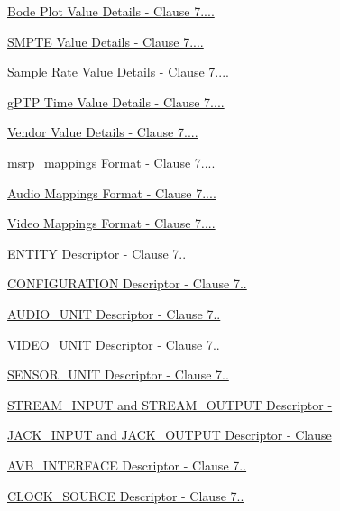 \begin{DoxyCompactItemize}
\item 
\hyperlink{group__values__bode__plot}{Bode Plot Value Details -\/ Clause 7....}
\item 
\hyperlink{group__values__smpte__time}{S\+M\+P\+T\+E Value Details -\/ Clause 7....}
\item 
\hyperlink{group__values__sample__rate}{Sample Rate Value Details -\/ Clause 7....}
\item 
\hyperlink{group__values__gptp__time}{g\+P\+T\+P Time Value Details -\/ Clause 7....}
\item 
\hyperlink{group__values__vendor}{Vendor Value Details -\/ Clause 7....}
\item 
\hyperlink{group__msrp__mappings__format}{msrp\+\_\+mappings Format -\/ Clause 7....}
\item 
\hyperlink{group__audio__mappings__format}{Audio Mappings Format -\/ Clause 7....}
\item 
\hyperlink{group__video__mappings__format}{Video Mappings Format -\/ Clause 7....}
\item 
\hyperlink{group__descriptor__entity}{E\+N\+T\+I\+T\+Y Descriptor -\/ Clause 7..}
\item 
\hyperlink{group__descriptor__configuration}{C\+O\+N\+F\+I\+G\+U\+R\+A\+T\+I\+O\+N Descriptor -\/ Clause 7..}
\item 
\hyperlink{group__descriptor__audio}{A\+U\+D\+I\+O\+\_\+\+U\+N\+I\+T Descriptor -\/ Clause 7..}
\item 
\hyperlink{group__descriptor__video}{V\+I\+D\+E\+O\+\_\+\+U\+N\+I\+T Descriptor -\/ Clause 7..}
\item 
\hyperlink{group__descriptor__sensor}{S\+E\+N\+S\+O\+R\+\_\+\+U\+N\+I\+T Descriptor -\/ Clause 7..}
\item 
\hyperlink{group__descriptor__stream}{S\+T\+R\+E\+A\+M\+\_\+\+I\+N\+P\+U\+T and S\+T\+R\+E\+A\+M\+\_\+\+O\+U\+T\+P\+U\+T Descriptor -\/}
\item 
\hyperlink{group__descriptor__jack}{J\+A\+C\+K\+\_\+\+I\+N\+P\+U\+T and J\+A\+C\+K\+\_\+\+O\+U\+T\+P\+U\+T Descriptor -\/ Clause}
\item 
\hyperlink{group__descriptor__avb__interface}{A\+V\+B\+\_\+\+I\+N\+T\+E\+R\+F\+A\+C\+E Descriptor -\/ Clause 7..}
\item 
\hyperlink{group__descriptor__clock__source}{C\+L\+O\+C\+K\+\_\+\+S\+O\+U\+R\+C\+E Descriptor -\/ Clause 7..}
\item 

\end{DoxyCompactItemize}
